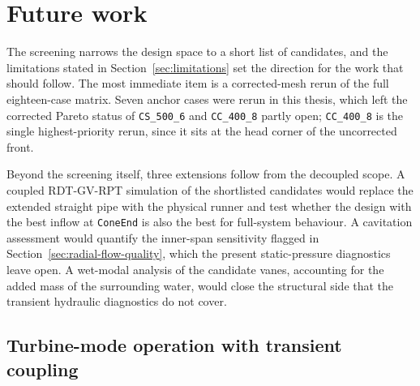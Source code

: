 \chapter{Future work}
\label{chap:future_work}

The screening narrows the design space to a short list of candidates, and the limitations stated in Section~\ref{sec:limitations} set the direction for the work that should follow. The most immediate item is a corrected-mesh rerun of the full eighteen-case matrix. Seven anchor cases were rerun in this thesis, which left the corrected Pareto status of \texttt{CS\_500\_6} and \texttt{CC\_400\_8} partly open; \texttt{CC\_400\_8} is the single highest-priority rerun, since it sits at the head corner of the uncorrected front.

Beyond the screening itself, three extensions follow from the decoupled scope. A coupled RDT-GV-RPT simulation of the shortlisted candidates would replace the extended straight pipe with the physical runner and test whether the design with the best inflow at \texttt{ConeEnd} is also the best for full-system behaviour. A cavitation assessment would quantify the inner-span sensitivity flagged in Section~\ref{sec:radial-flow-quality}, which the present static-pressure diagnostics leave open. A wet-modal analysis of the candidate vanes, accounting for the added mass of the surrounding water, would close the structural side that the transient hydraulic diagnostics do not cover.







\section{Turbine-mode operation with transient coupling}
\label{sec:fw-turbine-mode}


